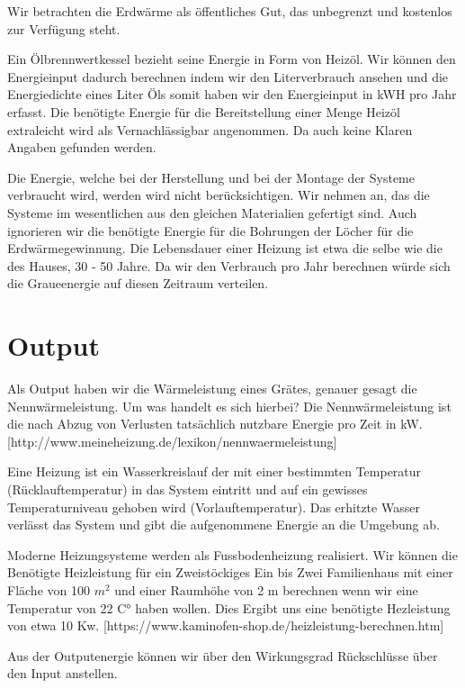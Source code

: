 Wir betrachten die Erdwärme als öffentliches Gut, das unbegrenzt und kostenlos
zur Verfügung steht.

Ein Ölbrennwertkessel bezieht seine Energie in Form von Heizöl.
Wir können den Energieinput dadurch berechnen indem wir den Literverbrauch
ansehen und die Energiedichte eines Liter Öls somit haben wir den
Energieinput in kWH pro Jahr erfasst.
Die benötigte Energie für die Bereitstellung einer Menge Heizöl extraleicht
wird als Vernachlässigbar angenommen. Da auch keine Klaren Angaben gefunden
werden.

Die Energie, welche bei der Herstellung und bei der Montage der Systeme
verbraucht wird, werden wird nicht berücksichtigen.
Wir nehmen an, das die Systeme im wesentlichen aus den gleichen Materialien
gefertigt sind. Auch ignorieren wir die benötigte Energie für die Bohrungen der
Löcher für die Erdwärmegewinnung.
Die Lebensdauer einer Heizung ist etwa die selbe wie die des Hauses, 
30 - 50 Jahre.
Da wir den Verbrauch pro Jahr berechnen würde sich die Graueenergie auf diesen
Zeitraum verteilen.

\section{Output}

Als Output haben wir die Wärmeleistung eines Grätes, genauer gesagt die
Nennwärmeleistung.
Um was handelt es sich hierbei?
Die Nennwärmeleistung ist die nach Abzug von Verlusten tatsächlich nutzbare
Energie pro Zeit in kW.
[http://www.meineheizung.de/lexikon/nennwaermeleistung]

Eine Heizung ist ein Wasserkreislauf der mit einer bestimmten Temperatur
(Rücklauftemperatur) in das System eintritt und auf ein gewisses Temperaturniveau
gehoben wird (Vorlauftemperatur). Das erhitzte Wasser verlässt das System und
gibt die aufgenommene Energie an die Umgebung ab.
 
Moderne Heizungsysteme werden als Fussbodenheizung realisiert.
Wir können die Benötigte Heizleistung für ein Zweistöckiges Ein bis Zwei
Familienhaus mit einer Fläche von 100 $m^2$ und einer Raumhöhe von 2 m berechnen
wenn wir eine Temperatur von 22 C° haben wollen.
Dies Ergibt uns eine benötigte Hezleistung von etwa 10 Kw.
[https://www.kaminofen-shop.de/heizleistung-berechnen.htm]

Aus der Outputenergie können wir über den Wirkungsgrad Rückschlüsse über
den Input anstellen.










